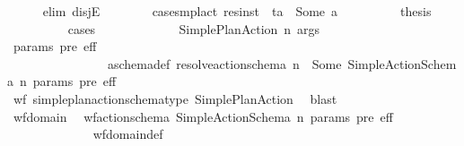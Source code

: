 \begin{isabellebody}
\ \ \ \ \isamarkupfalse%
\ {\isacharparenleft}{\kern0pt}elim\ disjE{\isacharparenright}{\kern0pt}\isanewline
\ \ \ \ \ \ \isamarkupfalse%
\ case{\isacharunderscore}{\kern0pt}smpl{\isacharunderscore}{\kern0pt}act{\isacharcolon}{\kern0pt}\ {\isachardoublequoteopen}res{\isacharunderscore}{\kern0pt}inst\ {\isasympi}\ ta\ {\isacharequal}{\kern0pt}\ Some\ a{\isachardoublequoteclose}\isanewline
\ \ \ \ \ \ \isamarkupfalse%
\ \isamarkupfalse%
\ {\isacharquery}{\kern0pt}thesis\ \isanewline
\ \ \ \ \ \ \ \ \isamarkupfalse%
\ {\isacharparenleft}{\kern0pt}cases\ {\isasympi}{\isacharparenright}{\kern0pt}\isanewline
\ \ \ \ \ \ \ \ \ \ \isamarkupfalse%
\ {\isacharparenleft}{\kern0pt}Simple{\isacharunderscore}{\kern0pt}Plan{\isacharunderscore}{\kern0pt}Action\ n\ args{\isacharparenright}{\kern0pt}\isanewline
\ \ \ \ \ \ \ \ \ \ \isamarkupfalse%
\ \isamarkupfalse%
\ params\ pre\ eff\ \ \isanewline
\ \ \ \ \ \ \ \ \ \ \ \ \ \ \ \ a\isactrlsub s\isactrlsub c\isactrlsub h\isactrlsub e\isactrlsub m\isactrlsub a{\isacharunderscore}{\kern0pt}def{\isacharcolon}{\kern0pt}\ {\isachardoublequoteopen}resolve{\isacharunderscore}{\kern0pt}action{\isacharunderscore}{\kern0pt}schema\ n\ {\isacharequal}{\kern0pt}\ Some\ {\isacharparenleft}{\kern0pt}Simple{\isacharunderscore}{\kern0pt}Action{\isacharunderscore}{\kern0pt}Schema\ n\ params\ pre\ eff{\isacharparenright}{\kern0pt}{\isachardoublequoteclose}\isanewline
\ \ \ \ \ \ \ \ \ \ \ \ \isamarkupfalse%
\ wf{\isacharunderscore}{\kern0pt}{\isasympi}\ simple{\isacharunderscore}{\kern0pt}plan{\isacharunderscore}{\kern0pt}action{\isacharunderscore}{\kern0pt}schema{\isacharunderscore}{\kern0pt}type{}\ Simple{\isacharunderscore}{\kern0pt}Plan{\isacharunderscore}{\kern0pt}Action\ \isamarkupfalse%
\ blast\isanewline
\ \ \ \ \ \ \ \ \ \ \isamarkupfalse%
\ wf{\isacharunderscore}{\kern0pt}domain\ \isamarkupfalse%
\ {\isachardoublequoteopen}wf{\isacharunderscore}{\kern0pt}action{\isacharunderscore}{\kern0pt}schema\ {\isacharparenleft}{\kern0pt}Simple{\isacharunderscore}{\kern0pt}Action{\isacharunderscore}{\kern0pt}Schema\ n\ params\ pre\ eff{\isacharparenright}{\kern0pt}{\isachardoublequoteclose}\isanewline
\ \ \ \ \ \ \ \ \ \ \ \ \isamarkupfalse%
\ wf{\isacharunderscore}{\kern0pt}domain{\isacharunderscore}{\kern0pt}def\ \isamarkupfalse%

\end{isabellebody}
